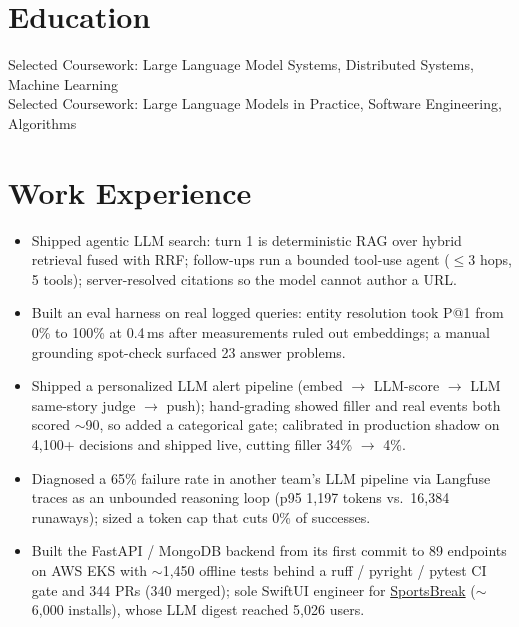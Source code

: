 \documentclass[11pt, letterpaper]{article}
\begin{document}

\section{Education}
Selected Coursework: Large Language Model Systems, Distributed Systems, Machine Learning\\[1pt]
Selected Coursework: Large Language Models in Practice, Software Engineering, Algorithms

\section{Work Experience}
\begin{itemize}
  \item Shipped agentic LLM search: turn 1 is deterministic RAG over hybrid retrieval fused with RRF; follow-ups run a bounded tool-use agent ($\le$3 hops, 5 tools); server-resolved citations so the model cannot author a URL.
  \item Built an eval harness on real logged queries: entity resolution took P@1 from 0\% to 100\% at 0.4\,ms after measurements ruled out embeddings; a manual grounding spot-check surfaced 23 answer problems.
  \item Shipped a personalized LLM alert pipeline (embed $\to$ LLM-score $\to$ LLM same-story judge $\to$ push); hand-grading showed filler and real events both scored $\sim$90, so added a categorical gate; calibrated in production shadow on 4{,}100+ decisions and shipped live, cutting filler 34\% $\to$ 4\%.
  \item Diagnosed a 65\% failure rate in another team's LLM pipeline via Langfuse traces as an unbounded reasoning loop (p95 1{,}197 tokens vs.\ 16{,}384 runaways); sized a token cap that cuts 0\% of successes.
  \item Built the FastAPI / MongoDB backend from its first commit to 89 endpoints on AWS EKS with $\sim$1{,}450 offline tests behind a ruff / pyright / pytest CI gate and 344 PRs (340 merged); sole SwiftUI engineer for \href{https://apps.apple.com/app/id6762649287}{SportsBreak} ($\sim$6{,}000 installs), whose LLM digest reached 5{,}026 users.
\end{itemize}
\end{document}
